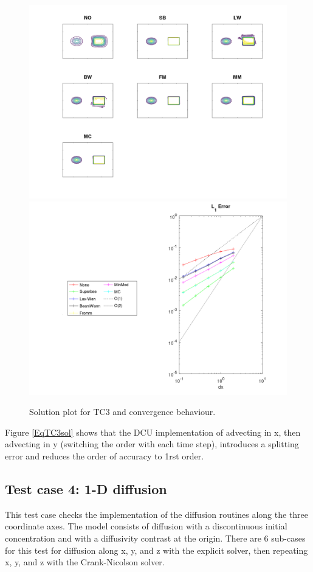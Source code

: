 \begin{figure}[htbp]\vspace*{0cm}\hspace*{0cm}
\includegraphics[angle=0,scale=0.3]{Figures/Apx_Test/TC3_LL_compare.png}
\includegraphics[angle=0,scale=0.3]{Figures/Apx_Test/TC3_LL_Solution_Error_L1.png}
\parbox{15cm}{\caption{\label{FigTest_ConvTC3}
Solution plot for TC3 and convergence behaviour.
}}
\end{figure}
Figure \ref{EqTC3sol} shows that the DCU implementation of advecting in x, then advecting
in y (switching the order with each time step), introduces a splitting error and reduces
the order of accuracy to 1rst order.

\subsection{Test case 4: 1-D diffusion}
This test case checks the implementation of the diffusion routines along the three
coordinate axes. The model consists of diffusion with a discontinuous initial
concentration and with a diffusivity contrast at the origin. There are 6 sub-cases for
this test for diffusion along x, y, and z with the explicit solver, then repeating
x, y, and z with the Crank-Nicolson solver.

